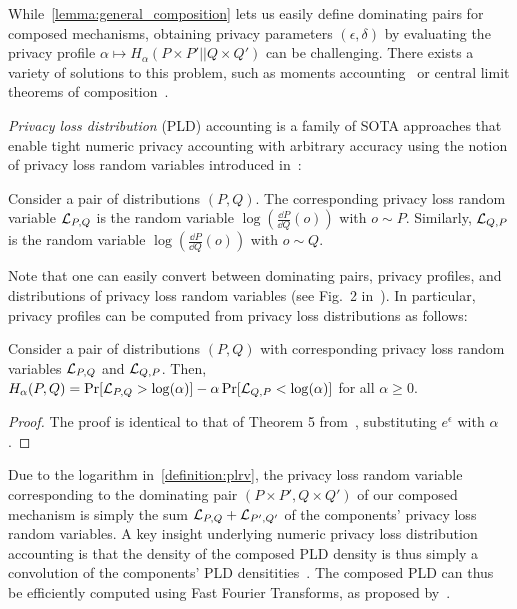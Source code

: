 While~\cref{lemma:general_composition} lets us easily define dominating pairs for composed mechanisms,  obtaining privacy parameters $(\epsilon,\delta)$ by evaluating the privacy profile
$\alpha \mapsto H_\alpha(P \times P' || Q \times Q')$ can be challenging. There exists a variety of solutions to this problem, such as moments accounting~\cite{abadi2016deep,mironov2017renyi} or central limit theorems of composition~\cite{sommer2018privacy,dong2022gaussian}.

\emph{Privacy loss distribution} (PLD) accounting is a family of SOTA approaches that enable tight numeric privacy accounting with arbitrary accuracy using the notion of privacy loss random variables introduced in~\cite{dwork2016concentrated}:
\begin{definition}\label{definition:plrv}
    Consider a pair of distributions $(P,Q)$.
    The corresponding privacy loss random variable $\mathcal{L}_{P,Q}$ is the random variable
    $\log\left(\frac{\dd P}{\dd Q}(o)\right)$ with $o \sim P$. Similarly, $\mathcal{L}_{Q,P}$ is the 
    random variable $\log\left(\frac{\dd P}{\dd Q}(o)\right)$ with $o \sim Q$.
\end{definition}
Note that one can easily convert between dominating pairs, privacy profiles, and distributions of privacy loss random variables (see Fig.\ 2 in~\cite{zhu2022optimal}). In particular, privacy profiles can be computed from privacy loss distributions as follows:
\begin{lemma}\label{lemma:profile_from_pld}
    Consider a pair of distributions $(P, Q)$ with corresponding privacy loss random variables $\mathcal{L}_{P,Q}$ and $\mathcal{L}_{Q,P}$.
    Then, $H_\alpha(P,Q) = \Pr[\mathcal{L}_{P,Q} > \log(\alpha)] - \alpha \Pr[\mathcal{L}_{Q,P} < \log(\alpha)]$ for all $\alpha \geq 0$.
\end{lemma}
\begin{proof}
    The proof is identical to that of Theorem 5 from~\cite{balle2018improving}, substituting $e^{\epsilon}$ with $\alpha$.
\end{proof}
Due to the logarithm in~\cref{definition:plrv}, the privacy loss random variable corresponding to the dominating pair $(P \times P', Q \times Q')$ of our composed mechanism is simply the sum 
$\mathcal{L}_{P,Q} + \mathcal{L}_{P',Q'}$ of the components' privacy loss random variables.
A key insight underlying numeric privacy loss distribution accounting is that the density of the composed PLD density is thus simply a convolution of the components' PLD densitities~\cite{Meiser2018Buckets,sommer2018privacy}.
The composed PLD can thus be efficiently computed using Fast Fourier Transforms, as proposed by~\citet{koskela2020computing}.

